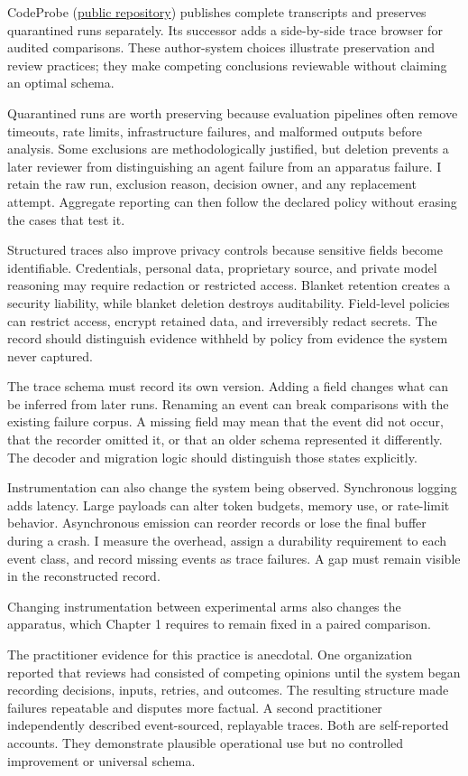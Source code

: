 CodeProbe (\href{https://github.com/sjarmak/codeprobe}{public repository}) publishes complete transcripts and preserves quarantined runs separately. Its successor adds a side-by-side trace browser for audited comparisons. These author-system choices illustrate preservation and review practices; they make competing conclusions reviewable without claiming an optimal schema.

Quarantined runs are worth preserving because evaluation pipelines often remove timeouts, rate limits, infrastructure failures, and malformed outputs before analysis. Some exclusions are methodologically justified, but deletion prevents a later reviewer from distinguishing an agent failure from an apparatus failure. I retain the raw run, exclusion reason, decision owner, and any replacement attempt. Aggregate reporting can then follow the declared policy without erasing the cases that test it.

Structured traces also improve privacy controls because sensitive fields become identifiable. Credentials, personal data, proprietary source, and private model reasoning may require redaction or restricted access. Blanket retention creates a security liability, while blanket deletion destroys auditability. Field-level policies can restrict access, encrypt retained data, and irreversibly redact secrets. The record should distinguish evidence withheld by policy from evidence the system never captured.

The trace schema must record its own version. Adding a field changes what can be inferred from later runs. Renaming an event can break comparisons with the existing failure corpus. A missing field may mean that the event did not occur, that the recorder omitted it, or that an older schema represented it differently. The decoder and migration logic should distinguish those states explicitly.

Instrumentation can also change the system being observed. Synchronous logging adds latency. Large payloads can alter token budgets, memory use, or rate-limit behavior. Asynchronous emission can reorder records or lose the final buffer during a crash. I measure the overhead, assign a durability requirement to each event class, and record missing events as trace failures. A gap must remain visible in the reconstructed record.

Changing instrumentation between experimental arms also changes the apparatus, which Chapter 1 requires to remain fixed in a paired comparison.

The practitioner evidence for this practice is anecdotal. One organization reported that reviews had consisted of competing opinions until the system began recording decisions, inputs, retries, and outcomes. The resulting structure made failures repeatable and disputes more factual. A second practitioner independently described event-sourced, replayable traces. Both are self-reported accounts. They demonstrate plausible operational use but no controlled improvement or universal schema.

